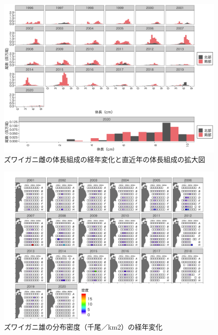 \documentclass[11pt]{article} %
\begin{document}
\begin{linenumbers}
\begin{figure}[h]
  \centering
  \includegraphics[width = 14cm]{ズワイガニ雌length.png}
  \caption{ズワイガニ雌の体長組成の経年変化と直近年の体長組成の拡大図}
\end{figure}

\begin{figure}[h]
  \centering
  \includegraphics[width = 14cm]{ズワイガニ雄dens.png}
  \caption{ズワイガニ雄の分布密度（千尾／km2）の経年変化}
\end{figure}


\end{linenumbers}
\end{document}
